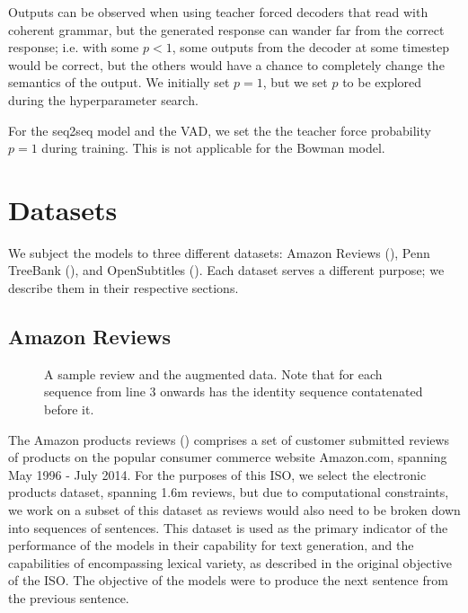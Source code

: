 \documentclass[12pt,twoside]{report}
\begin{document}
Outputs can be observed when using teacher forced decoders that read with coherent grammar, but the generated response can wander far from the correct response; i.e. with some $p<1$, some outputs from the decoder at some timestep would be correct, but the others would have a chance to completely change the semantics of the output. We initially set $p=1$, but we set $p$ to be explored during the hyperparameter search.

For the seq2seq model and the VAD, we set the the teacher force probability $p=1$ during training. This is not applicable for the Bowman model.

\section{Datasets}

We subject the models to three different datasets: Amazon Reviews (\cite{he_ups_2016}), Penn TreeBank (\cite{marcus_building_2002}), and OpenSubtitles (\cite{lison_opensubtitles2016:_2016}). Each dataset serves a different purpose; we describe them in their respective sections.

\subsection{Amazon Reviews}

\begin{figure}[!ht]
	\centering
	
	
	\caption{A sample review and the augmented data. Note that for each sequence from line 3 onwards has the identity sequence contatenated before it. \label{ex_dataset:amazon}}
\end{figure}

The Amazon products reviews (\cite{he_ups_2016}) comprises a set of customer submitted reviews of products on the popular consumer commerce website Amazon.com, spanning May 1996 - July 2014. For the purposes of this ISO, we select the electronic products dataset, spanning 1.6m reviews, but due to computational constraints, we work on a subset of this dataset as reviews would also need to be broken down into sequences of sentences. This dataset is used as the primary indicator of the performance of the models in their capability for text generation, and the capabilities of encompassing lexical variety, as described in the original objective of the ISO. The objective of the models were to produce the next sentence from the previous sentence. 
\end{document}

